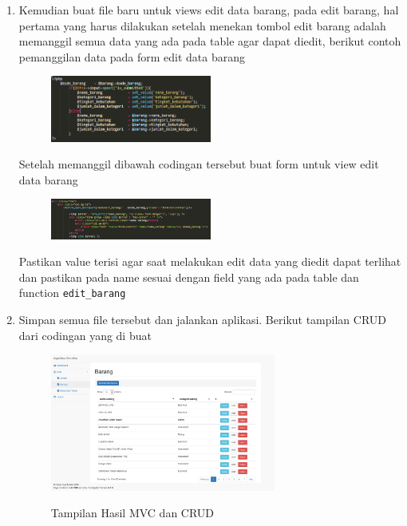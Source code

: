 \begin{enumerate}
\begin{enumerate}
    	\item Kemudian buat file baru untuk views edit data barang, pada edit barang, hal pertama yang harus dilakukan setelah menekan tombol edit barang adalah memanggil semua data yang ada pada table agar dapat diedit, berikut contoh pemanggilan data pada form edit data barang
    		\begin{figure}[!htbp]
        		\centering
        		\includegraphics[width=0.5\textwidth]{figures/Views3.PNG}
        		\label{Views3}
    		\end{figure}
    		\par Setelah memanggil dibawah codingan tersebut buat form untuk view edit data barang
    		\begin{figure}[!htbp]
        		\centering
        		\includegraphics[width=0.5\textwidth]{figures/Views4.PNG}
        		\label{Views4}
    		\end{figure}
    		\par Pastikan value terisi agar saat melakukan edit data yang diedit dapat terlihat dan pastikan pada name sesuai dengan field yang ada pada table dan function \verb|edit_barang|
    		
    	\item Simpan semua file tersebut dan jalankan aplikasi. Berikut tampilan CRUD dari codingan yang di buat
    		\begin{figure}[!htbp]
        		\centering
        		\caption{Tampilan Hasil MVC dan CRUD}
        		\includegraphics[width=0.7\textwidth]{figures/Views5.png}
        		\label{Views5}
    		\end{figure}
    \end{enumerate}
\end{enumerate}